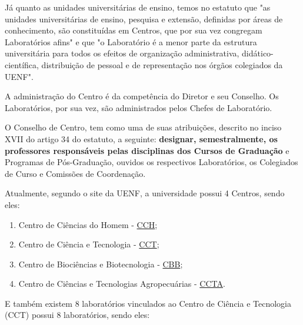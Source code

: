     Já quanto as unidades universitárias de ensino, temos no estatuto que "as unidades universitárias de ensino, pesquisa e extensão, definidas por áreas de conhecimento, são constituídas em Centros, que por sua vez congregam Laboratórios afins" e que "o Laboratório é a menor parte da estrutura universitária para todos os efeitos de organização administrativa, didático-científica, distribuição de pessoal e de representação nos órgãos colegiados da UENF".

    A administração do Centro é da competência do Diretor e seu Conselho. Os Laboratórios, por sua vez, são administrados pelos Chefes de Laboratório.

    O Conselho de Centro, tem como uma de suas atribuições, descrito no inciso XVII do artigo 34 do estatuto, a seguinte: \textbf{designar, semestralmente, os professores responsáveis pelas disciplinas dos Cursos de Graduação} e Programas de Pós-Graduação, ouvidos os respectivos Laboratórios, os Colegiados de Curso e Comissões de Coordenação.

    Atualmente, segundo o site da UENF, a universidade possui 4 Centros, sendo eles:

    \begin{enumerate}
        \item Centro de Ciências do Homem - \href{https://uenf.br/}{CCH};
        \item Centro de Ciência e Tecnologia - \href{https://uenf.br/cct/}{CCT};
        \item Centro de Biociências e Biotecnologia - \href{https://uenf.br/}{CBB};
        \item Centro de Ciências e Tecnologias Agropecuárias - \href{https://uenf.br/}{CCTA}.
    \end{enumerate}

    E também existem 8 laboratórios vinculados ao Centro de Ciência e Tecnologia (CCT) possui 8 laboratórios, sendo eles:

